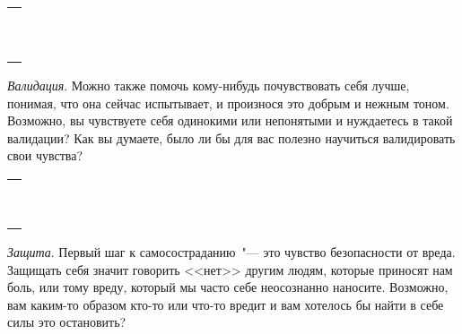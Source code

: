 \setlength{\extrarowheight}{2mm}
\begin{tabularx}{\textwidth}{X}
	\\
	\arrayrulecolor{gray}\hline\\
	\hline\\
	\hline\\
	\hline\\
	\hline\\
	\hline\\
	\hline\\
	\hline\\
	\hline\\
	\hline\\
	\hline\\
\end{tabularx}
\setlength{\extrarowheight}{0mm}

\begin{itemize}
	\itemyinyang \textit{Валидация}. Можно также помочь кому-нибудь почувствовать себя лучше, понимая, что она сейчас испытывает, и произнося это добрым и нежным тоном. Возможно, вы чувствуете себя одинокими или непонятыми и нуждаетесь в такой валидации? Как вы думаете, было ли бы для вас полезно научиться валидировать свои чувства?
\end{itemize}

\setlength{\extrarowheight}{2mm}
\begin{tabularx}{\textwidth}{X}
	\\
	\arrayrulecolor{gray}\hline\\
	\hline\\
	\hline\\
	\hline\\
	\hline\\
	\hline\\
	\hline\\
	\hline\\
	\hline\\
	\hline\\
\end{tabularx}
\setlength{\extrarowheight}{0mm}


\begin{itemize}
	\itemyinyang \textit{Защита}. Первый шаг к самосостраданию~"--- это чувство безопасности от вреда. Защищать себя значит говорить <<нет>> другим людям, которые приносят нам боль, или тому вреду, который мы часто себе неосознанно наносите. Возможно, вам каким-то образом кто-то или что-то вредит и вам хотелось бы найти в себе силы это остановить? 
\end{itemize}

